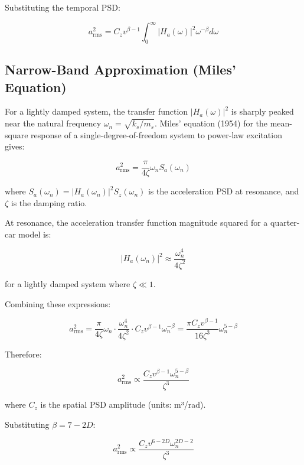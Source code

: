\documentclass[11pt]{article}
\begin{document}
Substituting the temporal PSD:

\begin{equation}
a_{\text{rms}}^2 = C_z v^{\beta-1} \int_0^\infty |H_a(\omega)|^2 \omega^{-\beta} d\omega
\end{equation}

\subsection{Narrow-Band Approximation (Miles' Equation)}

For a lightly damped system, the transfer function $|H_a(\omega)|^2$ is sharply peaked near the natural frequency $\omega_n = \sqrt{k_s/m_s}$. Miles' equation (1954) for the mean-square response of a single-degree-of-freedom system to power-law excitation gives:

\begin{equation}
a_{\text{rms}}^2 = \frac{\pi}{4\zeta} \omega_n S_a(\omega_n)
\end{equation}

where $S_a(\omega_n) = |H_a(\omega_n)|^2 S_z(\omega_n)$ is the acceleration PSD at resonance, and $\zeta$ is the damping ratio.

At resonance, the acceleration transfer function magnitude squared for a quarter-car model is:

\begin{equation}
|H_a(\omega_n)|^2 \approx \frac{\omega_n^4}{4\zeta^2}
\end{equation}

for a lightly damped system where $\zeta \ll 1$.

Combining these expressions:

\begin{equation}
a_{\text{rms}}^2 = \frac{\pi}{4\zeta} \omega_n \cdot \frac{\omega_n^4}{4\zeta^2} \cdot C_z v^{\beta-1} \omega_n^{-\beta} = \frac{\pi C_z v^{\beta-1}}{16\zeta^3} \omega_n^{5-\beta}
\end{equation}

Therefore:

\begin{equation}
a_{\text{rms}}^2 \propto \frac{C_z v^{\beta-1} \omega_n^{5-\beta}}{\zeta^3}
\end{equation}

where $C_z$ is the spatial PSD amplitude (units: m³/rad).

Substituting $\beta = 7-2D$:

\begin{equation}
a_{\text{rms}}^2 \propto \frac{C_z v^{6-2D} \omega_n^{2D-2}}{\zeta^3}
\end{equation}
\end{document}
